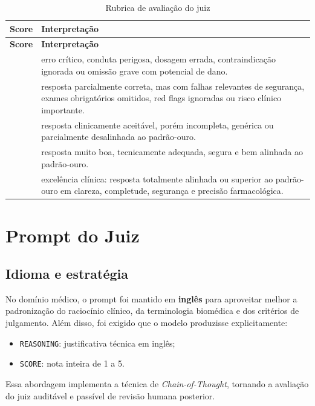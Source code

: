 \documentclass[12pt,a4paper]{article}
\begin{document}
\begin{longtable}{>{\RaggedRight\arraybackslash}p{} >{\RaggedRight\arraybackslash}p{}}
\caption{Rubrica de avaliação do juiz}\label{tab:rubrica}\\
\toprule
\textbf{Score} & \textbf{Interpretação} \\
\midrule
\endfirsthead
\toprule
\textbf{Score} & \textbf{Interpretação} \\
\midrule
\endhead
\bottomrule
\endfoot
1 & erro crítico, conduta perigosa, dosagem errada, contraindicação ignorada ou omissão grave com potencial de dano. \\
2 & resposta parcialmente correta, mas com falhas relevantes de segurança, exames obrigatórios omitidos, red flags ignoradas ou risco clínico importante. \\
3 & resposta clinicamente aceitável, porém incompleta, genérica ou parcialmente desalinhada ao padrão-ouro. \\
4 & resposta muito boa, tecnicamente adequada, segura e bem alinhada ao padrão-ouro. \\
5 & excelência clínica: resposta totalmente alinhada ou superior ao padrão-ouro em clareza, completude, segurança e precisão farmacológica. \\
\end{longtable}

\section{Prompt do Juiz}

\subsection{Idioma e estratégia}

No domínio médico, o prompt foi mantido em \textbf{inglês} para aproveitar melhor a padronização do raciocínio clínico, da terminologia biomédica e dos critérios de julgamento. Além disso, foi exigido que o modelo produzisse explicitamente:

\begin{itemize}[leftmargin=1.2cm]
    \item \texttt{REASONING}: justificativa técnica em inglês;
    \item \texttt{SCORE}: nota inteira de 1 a 5.
\end{itemize}

Essa abordagem implementa a técnica de \textit{Chain-of-Thought}, tornando a avaliação do juiz auditável e passível de revisão humana posterior.
\end{document}
